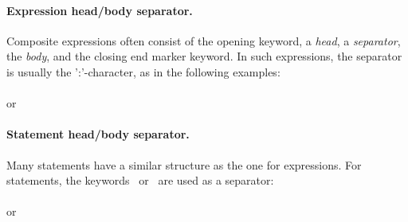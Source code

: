  

\paragraph{Expression head/body separator.} Composite expressions
often consist of the opening keyword, a {\em head}, a {\em separator}, the
{\em body}, and the closing end marker keyword. In such expressions, the
separator is usually the ':'-character, as in the following
examples:\\
\\
or\\

 
 

\paragraph{Statement head/body separator.} Many statements have a
similar structure as the one for expressions. For statements, the
keywords \kwDo~or \kwBegin~are used as a separator:\\
\\
or\\
\\
\exindent{}\\




